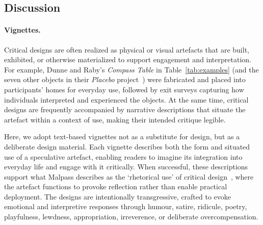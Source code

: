 \begin{table}


\end{table}



\subsection{Discussion}

\paragraph{Vignettes.} Critical designs are often realized as physical or visual artefacts that are built, exhibited, or otherwise materialized to support engagement and interpretation. For example, Dunne and Raby’s \textit{Compass Table} in Table~\ref{tab:examples} (and the seven other objects in their \textit{Placebo} project~\cite{DuRa01}) were fabricated and placed into participants’ homes for everyday use, followed by exit surveys capturing how individuals interpreted and experienced the objects. At the same time, critical designs are frequently accompanied by narrative descriptions that situate the artefact within a context of use, making their intended critique legible.

Here, we adopt text-based vignettes not as a substitute for design, but as a deliberate design material. Each vignette describes both the form and situated use of a speculative artefact, enabling readers to imagine its integration into everyday life and engage with it critically. When successful, these descriptions support what Malpass describes as the `rhetorical use' of critical design~\cite{Mal17}, where the artefact functions to provoke reflection rather than enable practical deployment. The designs are intentionally transgressive, crafted to evoke emotional and interpretive responses through humour, satire, ridicule, poetry, playfulness, lewdness, appropriation, irreverence, or deliberate overcompensation.

